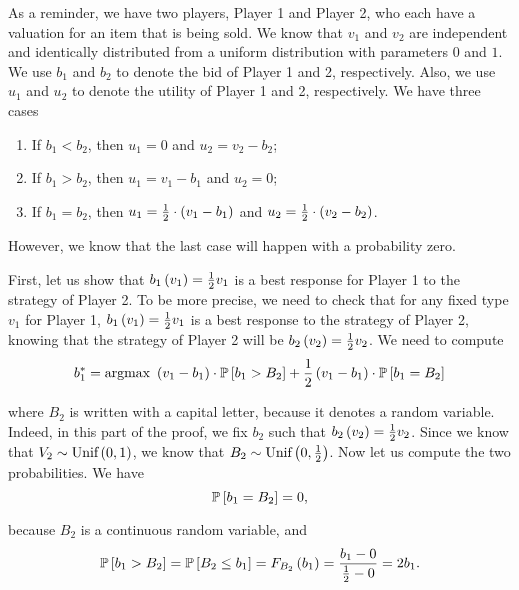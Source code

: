 As a reminder, we have two players, Player 1 and Player 2, who each have a valuation for an item that is being sold. We know that $v_1$ and $v_2$ are independent and identically distributed from a uniform distribution with parameters $0$ and $1$. We use $b_1$ and $b_2$ to denote the bid of Player 1 and 2, respectively. Also, we use $u_1$ and $u_2$ to denote the utility of Player 1 and 2, respectively. We have three cases
\begin{enumerate}
    \item If $b_1 < b_2$, then $u_1 = 0$ and $u_2 = v_2 - b_2$;
    \item If $b_1 > b_2$, then $u_1 = v_1 - b_1$ and $u_2 = 0$;
    \item If $b_1 = b_2$, then $u_1 = \frac{1}{2} \cdot \parent{v_1 - b_1}$ and $u_2 = \frac{1}{2} \cdot \parent{v_2 - b_2}$.
\end{enumerate}

However, we know that the last case will happen with a probability zero.

\vspace{5mm}


First, let us show that $b_1 \parent{v_1} = \frac{1}{2} v_1$ is a best response for Player 1 to the strategy of Player 2. To be more precise, we need to check that for any fixed type $v_1$ for Player 1, $b_1 \parent{v_1} = \frac{1}{2} v_1$ is a best response to the strategy of Player 2, knowing that the strategy of Player 2 will be $b_2 \parent{v_2} = \frac{1}{2} v_2$.
We need to compute
\begin{equation*}
    b_1^{*}
    = \text{argmax} \
    \parent{v_1 - b_1} \cdot \mathbb{P} \squared{b_1 > B_2}
    + \dfrac{1}{2} \parent{v_1 - b_1} \cdot \mathbb{P} \squared{b_1 = B_2}
\end{equation*}

where $B_2$ is written with a capital letter, because it denotes a random variable. Indeed, in this part of the proof, we fix $b_2$ such that $b_2 \parent{v_2} = \frac{1}{2} v_2$. Since we know that $V_2 \sim \text{Unif} \parent{0, 1}$, we know that $B_2 \sim \text{Unif} \parent{0, \frac{1}{2}}$. Now let us compute the two probabilities. We have
\begin{equation*}
    \mathbb{P} \squared{b_1 = B_2}
    = 0,
\end{equation*}

because $B_2$ is a continuous random variable, and
\begin{equation*}
    \mathbb{P} \squared{b_1 > B_2}
    = \mathbb{P} \squared{B_2 \leq b_1}
    = F_{B_2} \parent{b_1}
    = \dfrac{b_1 - 0}{\frac{1}{2} - 0}
    = 2 b_1.
\end{equation*}


